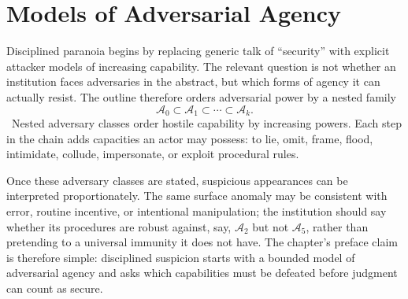 
\chapter{Models of Adversarial Agency}
\label{ch:ch059}


Disciplined paranoia begins by replacing generic talk of ``security'' with explicit attacker models of increasing capability. The relevant question is not whether an institution faces adversaries in the abstract, but which forms of agency it can actually resist. The outline therefore orders adversarial power by a nested family
\[
\mathcal A_0\subset\mathcal A_1\subset\cdots\subset\mathcal A_k.
\]
\Definition\ Nested adversary classes order hostile capability by increasing powers.
Each step in the chain adds capacities an actor may possess: to lie, omit, frame, flood, intimidate, collude, impersonate, or exploit procedural rules.

Once these adversary classes are stated, suspicious appearances can be interpreted proportionately. The same surface anomaly may be consistent with error, routine incentive, or intentional manipulation; the institution should say whether its procedures are robust against, say, \(\mathcal A_2\) but not \(\mathcal A_5\), rather than pretending to a universal immunity it does not have. The chapter's preface claim is therefore simple: disciplined suspicion starts with a bounded model of adversarial agency and asks which capabilities must be defeated before judgment can count as secure.
